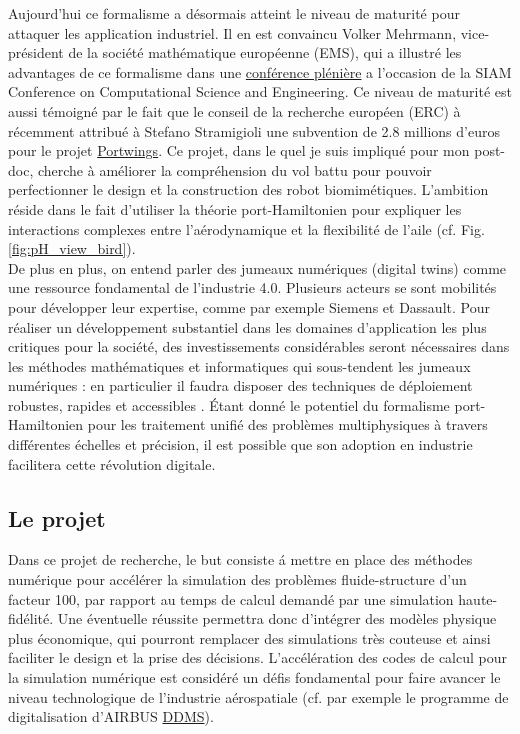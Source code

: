 \documentclass[french]{article}
\begin{document}
Aujourd'hui ce formalisme a désormais atteint le niveau de maturit\'e pour attaquer les application industriel. Il en est convaincu Volker Mehrmann, vice-président de la société mathématique européenne (EMS), qui a illustré les advantages de ce formalisme dans une \href{https://meetings.siam.org/sess/dsp_programsess.cfm?SESSIONCODE=70329}{conférence plénière} a l'occasion de la SIAM Conference on Computational Science and Engineering. Ce niveau de maturit\'e est aussi témoigné par le fait que le conseil de la recherche européen (ERC) \`a récemment attribu\'e \`a Stefano Stramigioli une subvention de 2.8 millions d'euros pour le projet \href{http://www.portwings.eu/}{Portwings}. Ce projet, dans le quel je suis impliqu\'e pour mon post-doc, cherche \`a améliorer la compréhension du vol battu pour pouvoir perfectionner le design et la construction des robot biomimétiques. L'ambition réside dans le fait d'utiliser la théorie port-Hamiltonien pour expliquer les interactions complexes entre l'aérodynamique et la flexibilit\'e de l'aile (cf. Fig. \ref{fig:pH_view_bird}). \\

De plus en plus, on entend parler des jumeaux numériques (digital twins) comme une ressource fondamental de l'industrie 4.0. Plusieurs acteurs se sont mobilités pour développer leur expertise, comme par exemple Siemens et Dassault. Pour réaliser un développement substantiel dans les domaines d'application les plus critiques pour la société, des investissements considérables seront nécessaires dans les méthodes mathématiques et informatiques qui sous-tendent les jumeaux numériques : en particulier il faudra disposer  des techniques de déploiement robustes, rapides et accessibles \cite{niederer2021}. Étant donné le potentiel du formalisme port-Hamiltonien pour les traitement unifié des problèmes multiphysiques \`a travers différentes échelles et précision, il est possible que son adoption en industrie facilitera cette révolution digitale. 


\subsection{Le projet}
Dans ce projet de recherche, le but consiste \'a mettre en place des méthodes numérique pour accélérer la simulation des problèmes fluide-structure d'un facteur 100, par rapport au temps de calcul demandé par une simulation haute-fidélité.  Une éventuelle réussite permettra donc d'intégrer des modèles physique plus économique, qui pourront remplacer des simulations très couteuse et ainsi faciliter le design et la prise des décisions. L'accélération des codes de calcul pour la simulation numérique est considéré un défis fondamental pour faire avancer le niveau technologique de l'industrie aérospatiale (cf. par exemple  le programme de digitalisation d'AIRBUS \href{https://www.airbus.com/innovation/industry-4-0/digital-design-and-manufacturing-ddms.html}{DDMS}).   \\
\end{document}
